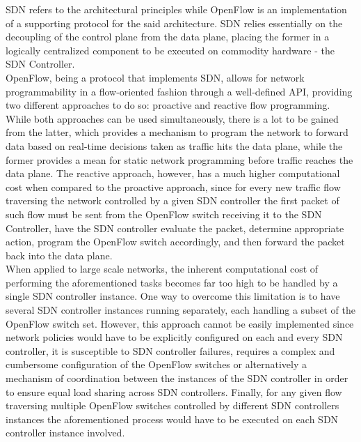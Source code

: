 \gls{SDN} refers to the architectural principles while OpenFlow is an implementation of a supporting protocol for the said architecture.
\gls{SDN} relies essentially on the decoupling of the control plane from the data plane, placing the former in a logically centralized component to be executed on commodity hardware - the \gls{SDN} Controller.\\
%
OpenFlow, being a protocol that implements \gls{SDN}, allows for network programmability in a flow-oriented fashion through a well-defined \gls{API}, providing two different approaches to do so: proactive and reactive flow programming.
While both approaches can be used simultaneously, there is a lot to be gained from the latter, which provides a mechanism to program the network to forward data based on real-time decisions taken as traffic hits the data plane, while the former provides a mean for static network programming before traffic reaches the data plane.
The reactive approach, however, has a much higher computational cost when compared to the proactive approach, since for every new traffic flow traversing the network controlled by a given \gls{SDN} controller the first packet of such flow must be sent from the OpenFlow switch receiving it to the \gls{SDN} Controller, have the \gls{SDN} controller evaluate the packet, determine appropriate action, program the OpenFlow switch accordingly, and then forward the packet back into the data plane.\\
%
When applied to large scale networks, the inherent computational cost of performing the aforementioned tasks becomes far too high to be handled by a single \gls{SDN} controller instance.
One way to overcome this limitation is to have several \gls{SDN} controller instances running separately, each handling a subset of the OpenFlow switch set.
However, this approach cannot be easily implemented since network policies would have to be explicitly configured on each and every \gls{SDN} controller, it is susceptible to \gls{SDN} controller failures, requires a complex and cumbersome configuration of the OpenFlow switches or alternatively a mechanism of coordination between the instances of the \gls{SDN} controller in order to ensure equal load sharing across \gls{SDN} controllers.
Finally, for any given flow traversing multiple OpenFlow switches controlled by different \gls{SDN} controllers instances the aforementioned process would have to be executed on each \gls{SDN} controller instance involved.\\
%
